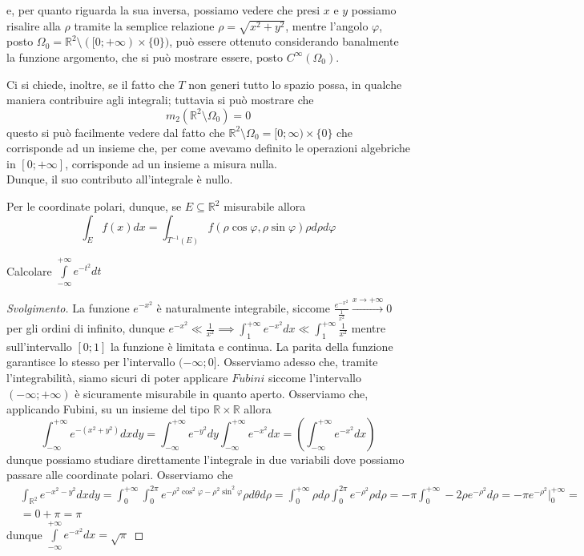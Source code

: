 e, per quanto riguarda la sua inversa, possiamo vedere che presi $x$ e $y$ possiamo risalire alla $\rho$ tramite la semplice relazione $\rho = \sqrt{x^2 + y^2}$, mentre 
l'angolo $\varphi$, posto $\Omega_0 = \mathbb{R}^2 \setminus ([0; +\infty) \times \{0\})$, può essere ottenuto considerando banalmente la funzione argomento, che si può mostrare essere, posto  $C^{\infty}(\Omega_0)$. \\
\begin{remark}
Ci si chiede, inoltre, se il fatto che $T$ non generi tutto lo spazio possa, in qualche maniera contribuire agli integrali; tuttavia si può mostrare che
$$
m_2(\mathbb{R}^2 \setminus \Omega_0) = 0
$$
questo si può facilmente vedere dal fatto che $\mathbb{R}^2 \setminus \Omega_0 = [0; \infty) \times \{0\}$ che corrisponde ad un insieme che, per come avevamo definito le operazioni algebriche in $[0; +\infty]$, corrisponde ad un insieme a misura nulla. \\
Dunque, il suo contributo all'integrale è nullo.
\end{remark}
Per le coordinate polari, dunque, se $E \subseteq \mathbb{R}^2$ misurabile allora
\begin{equation}
	\int_E f(x)dx = \int_{T^{-1}(E)} f(\rho \cos{\varphi}, \rho \sin{\varphi}) \rho d\rho d\varphi
\end{equation}
\begin{exercise}
	Calcolare $\int\limits_{-\infty}^{+\infty} e^{-t^2} dt$
\end{exercise}
\begin{proof}[Svolgimento]
	La funzione $e^{-x^2}$ è naturalmente integrabile, siccome $\frac{e^{-x^2}}{\frac{1}{x^2}} \stackrel{x \to +\infty}{\to} 0$ per gli ordini di infinito, dunque $e^{-x^2} \ll \frac{1}{x^2} \implies \int_1^{+\infty} e^{-x^2} dx \ll \int_1^{+\infty} \frac{1}{x^2}$ mentre sull'intervallo $[0; 1]$ la funzione è limitata e continua. La parita della funzione garantisce lo stesso per l'intervallo $(-\infty; 0]$. Osserviamo
	adesso che, tramite l'integrabilità, siamo sicuri di poter applicare $Fubini$ siccome l'intervallo $(-\infty; +\infty)$ è sicuramente misurabile in quanto aperto. Osserviamo che, applicando Fubini, su un insieme del tipo $\mathbb{R} \times \mathbb{R}$ allora
	$$
	\int_{-\infty}^{+\infty} e^{-(x^2 + y^2)}dxdy = \int_{-\infty}^{+\infty} e^{-y^2} dy \int_{-\infty}^{+\infty} e^{-x^2} dx = (\int_{-\infty}^{+\infty} e^{-x^2}dx)
	$$
	dunque possiamo studiare direttamente l'integrale in due variabili dove possiamo passare alle coordinate polari. Osserviamo che
	\begin{align*}
	&\int_{\mathbb{R}^2} e^{-x^2 - y^2} dxdy = \int_{0}^{+\infty} \int_{0}^{2\pi} e^{-\rho^2 \cos^2{\varphi} - \rho^2 \sin^2{\varphi}} \rho d\theta d\rho = \int_0^{+\infty} \rho d\rho \int_{0}^{2 \pi} e^{-\rho^2} \rho d\rho = -\pi \int_0^{+\infty} -2 \rho e^{-\rho^2} d\rho = - \pi e^{-\rho^2}\Bigg|^{+\infty}_{0} = \\
	&=0 + \pi = \pi
	\end{align*}
	dunque $\int\limits_{-\infty}^{+\infty} e^{-x^2} dx = \sqrt{\pi}$ 
\end{proof}
